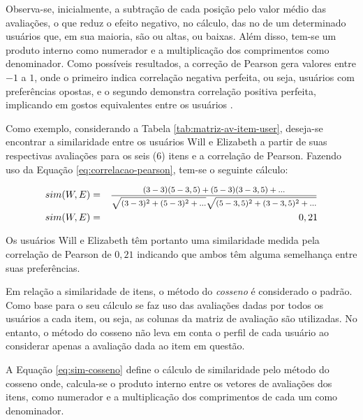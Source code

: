          Observa-se, inicialmente, a subtração de cada posição pelo valor médio das avaliações, o que reduz o efeito negativo, no cálculo, das no de um determinado usuários que, em sua maioria, são ou altas, ou baixas. Além disso, tem-se um produto interno como numerador e a multiplicação dos comprimentos como denominador. Como possíveis resultados, a correção de Pearson gera valores entre $-1$ a $1$, onde o primeiro indica correlação negativa perfeita, ou seja, usuários com preferências opostas, e o segundo demonstra correlação positiva perfeita, implicando em gostos equivalentes entre os usuários \cite{Jannach2010}.
        
        
        Como exemplo, considerando a Tabela \ref{tab:matriz-av-item-user}, deseja-se encontrar a similaridade entre os usuários Will e Elizabeth a partir de suas respectivas avaliações para os seis (6) itens e a correlação de Pearson. Fazendo uso da Equação \ref{eq:correlacao-pearson}, tem-se o seguinte cálculo:
        
        \begin{eqnarray}
            sim(W, E) &=& \text{\footnotesize   $\frac{(3-3)(5-3,5)+(5-3)(3-3,5)+...}{\sqrt{(3-3)^2+(5-3)^2+...}\sqrt{(5-3,5)^2+(3-3,5)^2+...}} $} \nonumber \\
            sim(W, E) &=& 0,21 \nonumber
        \end{eqnarray}
    
        Os usuários Will e Elizabeth têm portanto uma similaridade medida pela correlação de Pearson de $0,21$ indicando que ambos têm alguma semelhança entre suas preferências.
    
        Em relação a similaridade de itens, o método do \textit{cosseno} é considerado o padrão. Como base para o seu cálculo se faz uso das avaliações dadas por todos os usuários a cada item, ou seja, as colunas da matriz de avaliação são utilizadas. No entanto, o método do cosseno não leva em conta o perfil de cada usuário ao considerar apenas a avaliação dada ao item em questão\cite{Jannach2010}.
        
        A Equação \ref{eq:sim-cosseno} define o cálculo de similaridade pelo método do cosseno onde, calcula-se o produto interno entre os vetores de avaliações dos itens, como numerador e a multiplicação dos comprimentos de cada um como denominador.         
        
